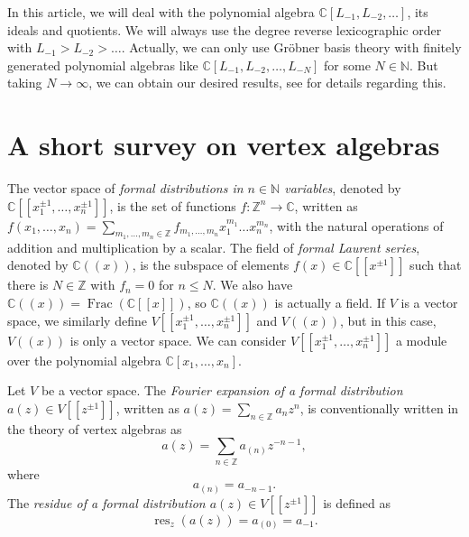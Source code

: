 \documentclass[a4paper, 12pt, reqno]{amsart}
\theoremstyle{remark}
\DeclareMathOperator{\Frac}{Frac}
\DeclareMathOperator{\res}{res}
\begin{document}
In this article, we will deal with the polynomial algebra $\mathbb{C}[L_{-1}, L_{-2}, \dots]$, its ideals and quotients.
We will always use the degree reverse lexicographic order with $L_{-1} > L_{-2} > \dots$.
Actually, we can only use Gröbner basis theory with finitely generated polynomial algebras like $\mathbb{C}[L_{-1}, L_{-2}, \dots, L_{-N}]$ for some $N \in \mathbb{N}$.
But taking $N \to \infty$, we can obtain our desired results, see \cite{salazar_pbw_2024} for details regarding this.

\section{A short survey on vertex algebras}
\label{sec:short-survey-vertex}

The vector space of \emph{formal distributions in $n \in \mathbb{N}$ variables}, denoted by $\mathbb{C}[[x_1^{\pm1}, \dots, x_n^{\pm1}]]$, is the set of functions $f: \mathbb{Z}^n \to \mathbb{C}$, written as $f(x_1, \dots, x_n) = \sum_{m_1, \dots, m_n \in \mathbb{Z}}f_{m_1, \dots, m_n}x_1^{m_1}\dots x_n^{m_n}$, with the natural operations of addition and multiplication by a scalar.
The field of \emph{formal Laurent series}, denoted by $\mathbb{C}((x))$, is the subspace of elements $f(x) \in \mathbb{C}[[x^{\pm1}]]$ such that there is $N \in \mathbb{Z}$ with $f_n = 0$ for $n \le N$.
We also have $\mathbb{C}((x)) = \Frac(\mathbb{C}[[x]])$, so $\mathbb{C}((x))$ is actually a field.
If $V$ is a vector space, we similarly define $V[[x_1^{\pm1}, \dots, x_n^{\pm1}]]$ and $V((x))$, but in this case, $V((x))$ is only a vector space.
We can consider $V[[x_1^{\pm1}, \dots, x_n^{\pm1}]]$ a module over the polynomial algebra $\mathbb{C}[x_1, \dots, x_n]$.

Let $V$ be a vector space.
The \emph{Fourier expansion of a formal distribution $a(z) \in V[[z^{\pm1}]]$}, written as $a(z) = \sum_{n \in \mathbb{Z}}a_nz^n$, is conventionally written in the theory of vertex algebras as
\begin{equation*}
  a(z) = \sum_{n \in \mathbb{Z}}a_{(n)}z^{-n - 1},
\end{equation*}
where
\begin{equation*}
  a_{(n)} = a_{-n - 1}.
\end{equation*}
The \emph{residue of a formal distribution $a(z) \in V[[z^{\pm1}]]$} is defined as
\begin{equation*}
  \res_z(a(z)) = a_{(0)} = a_{-1}.
\end{equation*}
\end{document}
